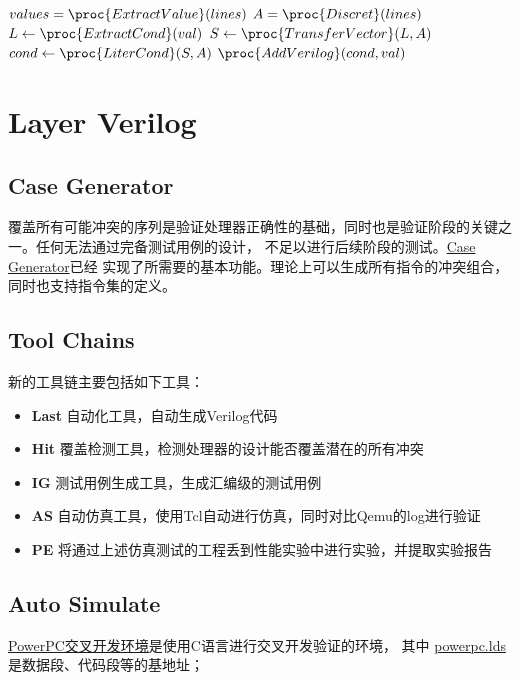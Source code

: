 \documentclass[hyperref,UTF8]{ctexart}
\theoremstyle{definition}
\theoremstyle{remark}
\numberwithin{equation}{subsection}
\newcommand{\Emph}{\textbf}
\begin{document}
	\begin{codebox}
	\li	$values = \proc{ExtractValue}(lines)$
	\li	$A = \proc{Discret}(lines)$
	\li	\For {}  
	\li		\Do
				$L \gets \proc{ExtractCond}(val)$
	\li			$S \gets \proc{TransferVector}(L, A)$
	\li			$cond \gets \proc{LiterCond}(S, A)$
	\li			$\proc{AddVerilog}(cond, val)$
			\End
	\end{codebox}
	
\section{Layer Verilog}
\label{sec:layer_verilog}	

\subsection{Case Generator}

	覆盖所有可能冲突的序列是验证处理器正确性的基础，同时也是验证阶段的关键之一。任何无法通过完备测试用例的设计，
	不足以进行后续阶段的测试。\href{https://github.com/Turf1013/PPC_AutoTool/tree/master/IG}{Case Generator}已经
	实现了所需要的基本功能。理论上可以生成所有指令的冲突组合，同时也支持指令集的定义。

\subsection{Tool Chains}
	
	新的工具链主要包括如下工具：
	\begin{itemize}
		\item \Emph{Last} 自动化工具，自动生成Verilog代码
		\item \Emph{Hit} 覆盖检测工具，检测处理器的设计能否覆盖潜在的所有冲突
		\item \Emph{IG} 测试用例生成工具，生成汇编级的测试用例
		\item \Emph{AS} 自动仿真工具，使用Tcl自动进行仿真，同时对比Qemu的log进行验证
		\item \Emph{PE} 将通过上述仿真测试的工程丢到性能实验中进行实验，并提取实验报告
	\end{itemize}
	
\subsection{Auto Simulate}

	\href{https://github.com/Turf1013/PPC_AutoTool/tree/master/PPC}{PowerPC交叉开发环境}是使用C语言进行交叉开发验证的环境，
	其中
	\href{https://github.com/Turf1013/PPC_AutoTool/blob/master/PPC/global/powerpc.lds}{powerpc.lds}是数据段、代码段等的基地址；
	
\end{document}
